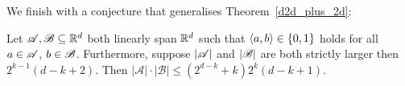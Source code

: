 \noindent We finish with a conjecture that generalises Theorem~\ref{d2d_plus_2d}:

\begin{conjecture}
    Let ${\mathscr{A}},{\mathscr{B}} \subseteq {\mathbb{R}}^d$ both linearly span ${\mathbb{R}}^d$ such that $\langle a, b\rangle \in \{0,1\}$ holds for all $a \in {\mathscr{A}}$, $b \in {\mathscr{B}}$. Furthermore, suppose $|{\mathscr{A}}|$ and $|{\mathscr{B}}|$ are both strictly larger then $2^{k-1}(d-k+2)$. Then $\left|\mathcal{A}\right| \cdot\left|\mathcal{B}\right| \leq (2^{d-k}+k)2^k(d-k+1)$.
\end{conjecture}